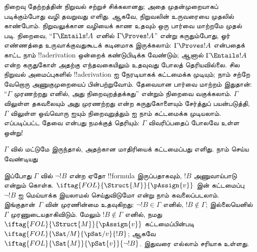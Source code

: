 \documentclass[../../../include/open-logic-section]{subfiles}
\begin{document}
      {}
      {}


நிறைவு தேற்றத்தின் நிறுவல் சற்றுச் சிக்கலானது; அதை முதன்முறையாகப்
படிக்கும்போது வழி தவறுவது எளிது. ஆகவே, நிறுவலின் உருவரையை முதலில்
காண்போம். நிறுவலுக்கான வழியைக் காண உதவும் ஒரு பார்வை மாற்றமே முதல் படி.
நிறைவை, ``$\Gamma \Entails !A$ எனில் $\Gamma \Proves !A$'' என்று
கருதும்போது, ஓர் எண்ணத்தை உருவாக்குவதுகூடக் கடினமாக இருக்கலாம்:
$\Gamma \Proves !A$ என்பதைக் காட்ட நாம் !!a{derivation} ஒன்றைக் கண்டுபிடிக்க
வேண்டும்; ஆனால் $\Gamma \Entails !A$ என்ற கருதுகோள் அதற்கு எந்தவகையிலும்
உதவுவது போலத் தெரியவில்லை. சில நிறுவல் அமைப்புகளில் !!a{derivation} ஐ
நேரடியாகக் கட்டமைக்க முடியும்; நாம் சற்றே வேறொரு அணுகுமுறையைப் பின்பற்றுவோம்.
தேவையான பார்வை மாற்றம் இதுதான்: ``$\Gamma$ முரணற்றது எனில், அது
நிறைவுறத்தக்கது'' என்றும் நிறைவை வகுக்கலாம். $\Gamma$ விலுள்ள தகவலையும் அது
முரணற்றது என்ற கருதுகோளையும் சேர்த்துப் பயன்படுத்தி, $\Gamma$ விலுள்ள ஒவ்வொரு
 ஐயும் நிறைவுறுத்தும்
 ஐ நாம் கட்டமைக்க முடியலாம்.
எப்படிப்பட்ட  தேவை என்பது நமக்குத்
தெரியும்: $\Gamma$ விவரிப்பதைப் போலவே உள்ள ஒன்று!{}

$\Gamma$ வில் 
மட்டுமே இருந்தால், அதற்கான மாதிரியைக் கட்டமைப்பது எளிது. நாம் செய்ய வேண்டியது

இப்போது $\Gamma$ வில் $\lnot !B$ என்ற ஏதோ !!{formula} இருப்பதாகவும், $!B$
அணுவாய்பாடு என்றும் கொள்க. $\iftag{FOL}{\Struct{M}}{\pAssign{v}}$ இன்
கட்டமைப்பு $\lnot !B$ ஐ மெய்யாக்க இயலாமல் செய்துவிடுமோ என்று நாம் கவலைப்படலாம்.
இங்குதான்~$\Gamma$ வின் முரணின்மை உதவுகிறது: $\lnot !B \in \Gamma$ எனில்,
$!B \notin \Gamma$; இல்லையெனில் $\Gamma$ முரணுடையதாகிவிடும். மேலும்
$!B \notin \Gamma$ எனில், நமது
$\iftag{FOL}{\Struct{M}}{\pAssign{v}}$ கட்டமைப்பின்படி
$\iftag{FOL}{\Sat/{M}}{\pSat/{v}}{!B}$; ஆகவே
$\iftag{FOL}{\Sat{M}}{\pSat{v}}{\lnot !B}$. இதுவரை எல்லாம் சரியாக உள்ளது.
\end{document}
